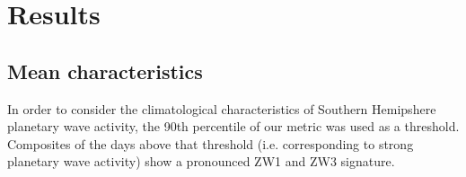 \section{Results}

\subsection{Mean characteristics}

In order to consider the climatological characteristics of Southern Hemipshere planetary wave activity, the 90th percentile of our metric was used as a threshold. Composites of the days above that threshold (i.e. corresponding to strong planetary wave activity) show a pronounced ZW1 and ZW3 signature. 




